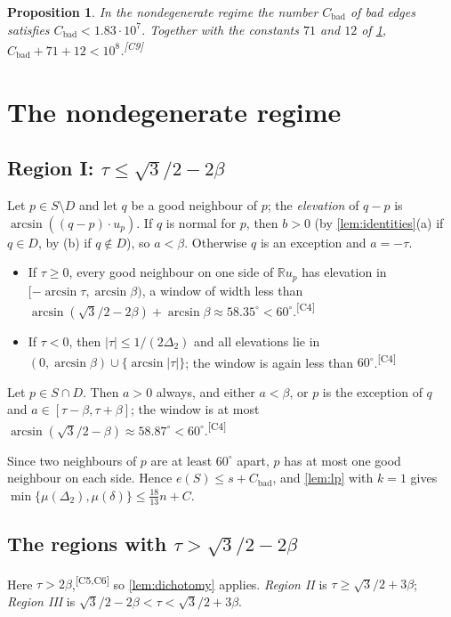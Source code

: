 \documentclass[11pt]{amsart}
\newtheorem{proposition}[theorem]{Proposition}
\theoremstyle{definition}
\theoremstyle{remark}
\newcommand{\R}{\mathbb{R}}
\newcommand{\Dt}{\Delta_2}
\newcommand{\mult}{\mu}
\newcommand{\chk}[1]{\textsuperscript{[#1]}}
\begin{document}
\begin{proposition}\label{prop:bad}
In the nondegenerate regime the number $C_{\mathrm{bad}}$ of bad edges satisfies $C_{\mathrm{bad}}<1.83\cdot10^7$. Together with the constants $71$ and $12$ of \cref{sec:regions}, $C_{\mathrm{bad}}+71+12<10^8$.\chk{C9}
\end{proposition}

\section{The nondegenerate regime}\label{sec:regions}

\subsection{Region I: \texorpdfstring{$\tau\le\sqrt3/2-2\beta$}{tau <= sqrt3/2 - 2 beta}}\label{sec:regionI}
Let $p\in S\setminus D$ and let $q$ be a good neighbour of $p$; the \emph{elevation} of $q-p$ is $\arcsin((q-p)\cdot u_p)$. If $q$ is normal for $p$, then $b>0$ (by \cref{lem:identities}(a) if $q\in D$, by (b) if $q\notin D$), so $a<\beta$. Otherwise $q$ is an exception and $a=-\tau$.
\begin{itemize}[leftmargin=2em]
\item If $\tau\ge0$, every good neighbour on one side of $\R u_p$ has elevation in $[-\arcsin\tau,\arcsin\beta)$, a window of width less than $\arcsin(\sqrt3/2-2\beta)+\arcsin\beta\approx58.35^\circ<60^\circ$.\chk{C4}
\item If $\tau<0$, then $|\tau|\le1/(2\Dt)$ and all elevations lie in $(0,\arcsin\beta)\cup\{\arcsin|\tau|\}$; the window is again less than $60^\circ$.\chk{C4}
\end{itemize}
Let $p\in S\cap D$. Then $a>0$ always, and either $a<\beta$, or $p$ is the exception of $q$ and $a\in[\tau-\beta,\tau+\beta]$; the window is at most $\arcsin(\sqrt3/2-\beta)\approx58.87^\circ<60^\circ$.\chk{C4}

Since two neighbours of $p$ are at least $60^\circ$ apart, $p$ has at most one good neighbour on each side. Hence $e(S)\le s+C_{\mathrm{bad}}$, and \cref{lem:lp} with $k=1$ gives $\min\{\mult(\Dt),\mult(\delta)\}\le\frac{18}{13}n+C$.

\subsection{The regions with \texorpdfstring{$\tau>\sqrt3/2-2\beta$}{tau > sqrt3/2 - 2 beta}}
Here $\tau>2\beta$,\chk{C5,C6} so \cref{lem:dichotomy} applies. \emph{Region II} is $\tau\ge\sqrt3/2+3\beta$; \emph{Region III} is $\sqrt3/2-2\beta<\tau<\sqrt3/2+3\beta$.
\end{document}

